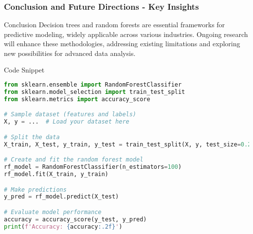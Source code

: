 \documentclass{beamer}
\begin{document}
\begin{frame}[fragile]
    \frametitle{Conclusion and Future Directions - Key Insights}

    \begin{block}{Conclusion}
        Decision trees and random forests are essential frameworks for predictive modeling, widely applicable across various industries. Ongoing research will enhance these methodologies, addressing existing limitations and exploring new possibilities for advanced data analysis.
    \end{block}

    \begin{block}{Code Snippet}
        \begin{lstlisting}[language=Python]
from sklearn.ensemble import RandomForestClassifier
from sklearn.model_selection import train_test_split
from sklearn.metrics import accuracy_score

# Sample dataset (features and labels)
X, y = ...  # Load your dataset here

# Split the data
X_train, X_test, y_train, y_test = train_test_split(X, y, test_size=0.2, random_state=42)

# Create and fit the random forest model
rf_model = RandomForestClassifier(n_estimators=100)
rf_model.fit(X_train, y_train)

# Make predictions
y_pred = rf_model.predict(X_test)

# Evaluate model performance
accuracy = accuracy_score(y_test, y_pred)
print(f'Accuracy: {accuracy:.2f}')
        \end{lstlisting}
    \end{block}

\end{frame}
\end{document}
